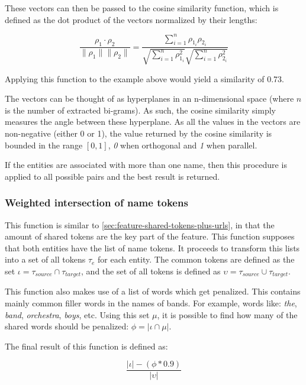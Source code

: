 \documentclass[epsfig,a4paper,11pt,titlepage,twoside,openany]{book}
\begin{document}
These vectors can then be passed to the cosine similarity function, which is defined as the dot product of the vectors normalized by their lengths:

$$
\frac{\rho_1 \cdot \rho_2}{\|\rho_1\| \|\rho_2\|} = \frac{
\sum_{i=1}^n \rho_{1_i} \rho_{2_i}}{
\sqrt{\sum_{i=1}^n \rho_{1_i}^2}
\sqrt{\sum_{i=1}^n \rho_{2_i}^2}
}
$$

Applying this function to the example above would yield a similarity of 0.73. 

The vectors can be thought of as hyperplanes in an n-dimensional space (where $n$ is the number of extracted bi-grams). As such, the cosine similarity simply measures the angle between these hyperplane. As all the values in the vectors are non-negative (either 0 or 1), the value returned by the cosine similarity is bounded in the range $[0,1]$, \textit{0} when orthogonal and \textit{1} when parallel.

If the entities are associated with more than one name, then this procedure is applied to all possible pairs and the best result is returned.



\subsubsection{Weighted intersection of name tokens}
\label{sec:feature-wighted-name-intersection}

This function is similar to \autoref{sec:feature-shared-tokens-plus-urls}, in that the amount of shared tokens are the key part of the feature. This function supposes that both entities have the list of name tokens. It proceeds to transform this lists into a set of all tokens $\tau_e$ for each entity. The common tokens are defined as the set $\iota = \tau_{source} \cap \tau_{target}$, and the set of all tokens is defined as $\upsilon = \tau_{source} \cup \tau_{target}$. 

This function also makes use of a list of words which get penalized. This contains mainly common filler words in the names of bands. For example, words like: \textit{the}, \textit{band}, \textit{orchestra}, \textit{boys}, etc. Using this set $\mu$, it is possible to find how many of the shared words should be penalized: $\phi = |\iota \cap \mu|$.

The final result of this function is defined as:

\begin{equation*}
    \frac{
    |\iota| - (\phi * 0.9)
    }{
    |\upsilon|
    }
\end{equation*}
\end{document}
